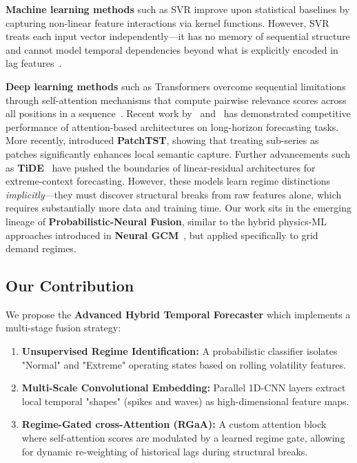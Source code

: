 \documentclass[conference, 10pt]{IEEEtran}
\begin{document}
\textbf{Machine learning methods} such as SVR improve upon statistical baselines by capturing non-linear feature interactions via kernel functions. However, SVR treats each input vector independently---it has no memory of sequential structure and cannot model temporal dependencies beyond what is explicitly encoded in lag features~\cite{smola2004tutorial}.

\textbf{Deep learning methods} such as Transformers overcome sequential limitations through self-attention mechanisms that compute pairwise relevance scores across all positions in a sequence~\cite{vaswani2017attention}. Recent work by~\citet{li2019enhancing} and~\citet{zhou2021informer} has demonstrated competitive performance of attention-based architectures on long-horizon forecasting tasks. More recently, \citet{nie2023patchtst} introduced \textbf{PatchTST}, showing that treating sub-series as patches significantly enhances local semantic capture. Further advancements such as \textbf{TiDE}~\cite{das2023tide} have pushed the boundaries of linear-residual architectures for extreme-context forecasting. However, these models learn regime distinctions \emph{implicitly}---they must discover structural breaks from raw features alone, which requires substantially more data and training time. Our work sits in the emerging lineage of \textbf{Probabilistic-Neural Fusion}, similar to the hybrid physics-ML approaches introduced in \textbf{Neural GCM}~\cite{kochiatosh2024neuralgcm}, but applied specifically to grid demand regimes.

\subsection{Our Contribution}

We propose the \textbf{Advanced Hybrid Temporal Forecaster} which implements a multi-stage fusion strategy:
\begin{enumerate}
    \item \textbf{Unsupervised Regime Identification:} A probabilistic classifier isolates "Normal" and "Extreme" operating states based on rolling volatility features.
    \item \textbf{Multi-Scale Convolutional Embedding:} Parallel 1D-CNN layers extract local temporal "shapes" (spikes and waves) as high-dimensional feature maps.
    \item \textbf{Regime-Gated cross-Attention (RGaA):} A custom attention block where self-attention scores are modulated by a learned regime gate, allowing for dynamic re-weighting of historical lags during structural breaks.
\end{enumerate}
\end{document}
